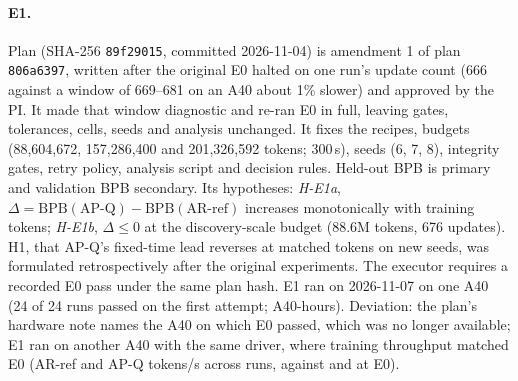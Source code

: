 \documentclass{article}
\begin{document}
\paragraph{E1.} Plan  (SHA-256 \texttt{89f29015}, committed 2026-11-04) is amendment 1 of plan \texttt{806a6397}, written after the original E0 halted on one run's update count (666 against a window of 669--681 on an A40 about 1\% slower) and approved by the PI. It made that window diagnostic and re-ran E0 in full, leaving gates, tolerances, cells, seeds and analysis unchanged. It fixes the recipes, budgets (88,604,672, 157,286,400 and 201,326,592 tokens; 300\,s), seeds (6, 7, 8), integrity gates, retry policy, analysis script and decision rules. Held-out BPB is primary and validation BPB secondary. Its hypotheses: \emph{H-E1a}, $\Delta=\mathrm{BPB}(\text{AP-Q})-\mathrm{BPB}(\text{AR-ref})$ increases monotonically with training tokens; \emph{H-E1b}, $\Delta\le0$ at the discovery-scale budget (88.6M tokens, 676 updates). H1, that AP-Q's fixed-time lead reverses at matched tokens on new seeds, was formulated retrospectively after the original experiments. The executor requires a recorded E0 pass under the same plan hash. E1 ran on 2026-11-07 on one A40 (24 of 24 runs passed on the first attempt; \CREOneHours{} A40-hours). Deviation: the plan's hardware note names the A40 on which E0 passed, which was no longer available; E1 ran on another A40 with the same driver, where training throughput matched E0 (AR-ref \CREOneTputAR{} and AP-Q \CREOneTputAP{} tokens/s across runs, against \CREZeroTputAR{} and \CREZeroTputAP{} at E0).
\end{document}
